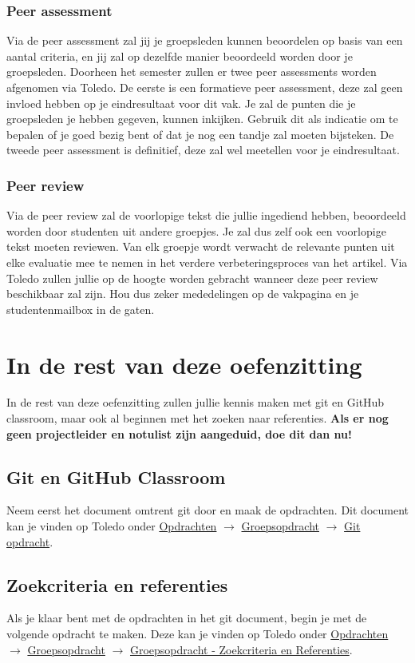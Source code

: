\documentclass[a4paper]{article}
\begin{document}
\subsubsection{Peer assessment}

Via de peer assessment zal jij je groepsleden kunnen beoordelen op basis van een aantal criteria, en jij zal op dezelfde manier beoordeeld worden door je groepsleden.
Doorheen het semester zullen er twee peer assessments worden afgenomen via Toledo.
De eerste is een formatieve peer assessment, deze zal geen invloed hebben op je eindresultaat voor dit vak.
Je zal de punten die je groepsleden je hebben gegeven, kunnen inkijken.
Gebruik dit als indicatie om te bepalen of je goed bezig bent of dat je nog een tandje zal moeten bijsteken.
De tweede peer assessment is definitief, deze zal wel meetellen voor je eindresultaat.


\subsubsection{Peer review}

Via de peer review zal de voorlopige tekst die jullie ingediend hebben, beoordeeld worden door studenten uit andere groepjes.
Je zal dus zelf ook een voorlopige tekst moeten reviewen.
Van elk groepje wordt verwacht de relevante punten uit elke evaluatie mee te nemen in het verdere verbeteringsproces van het artikel.
Via Toledo zullen jullie op de hoogte worden gebracht wanneer deze peer review beschikbaar zal zijn.
Hou dus zeker mededelingen op de vakpagina en je studentenmailbox in de gaten.


\section{In de rest van deze oefenzitting}

In de rest van deze oefenzitting zullen jullie kennis maken met git en GitHub classroom, maar ook al beginnen met het zoeken naar referenties.
\textbf{Als er nog geen projectleider en notulist zijn aangeduid, doe dit dan nu!}


\subsection{Git en GitHub Classroom}

Neem eerst het document omtrent git door en maak de opdrachten.
Dit document kan je vinden op Toledo onder \underline{Opdrachten} $\rightarrow$ \underline{Groepsopdracht} $\rightarrow$ \underline{Git opdracht}.


\subsection{Zoekcriteria en referenties}

Als je klaar bent met de opdrachten in het git document, begin je met de volgende opdracht te maken.
Deze kan je vinden op Toledo onder \underline{Opdrachten} $\rightarrow$ \underline{Groepsopdracht} $\rightarrow$ \uline{Groepsopdracht - Zoekcriteria en Referenties}.



\end{document}
